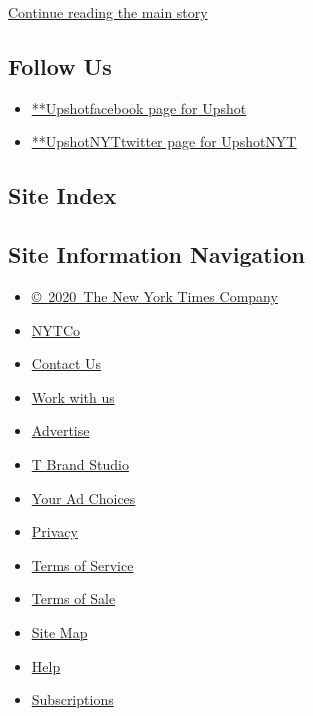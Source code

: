 \protect\hyperlink{after-mktg}{Continue reading the main story}

\hypertarget{follow-us}{%
\subsection{Follow Us}\label{follow-us}}

\begin{itemize}
\tightlist
\item
  \href{https://www.facebook.com/Upshot}{**Upshotfacebook page for
  Upshot}
\item
  \href{https://twitter.com/UpshotNYT}{**UpshotNYTtwitter page for
  UpshotNYT}
\end{itemize}

\hypertarget{site-index}{%
\subsection{Site Index}\label{site-index}}

\hypertarget{site-information-navigation}{%
\subsection{Site Information
Navigation}\label{site-information-navigation}}

\begin{itemize}
\tightlist
\item
  \href{https://help.nytimes.com/hc/en-us/articles/115014792127-Copyright-notice}{©~2020~The
  New York Times Company}
\end{itemize}

\begin{itemize}
\tightlist
\item
  \href{https://www.nytco.com/}{NYTCo}
\item
  \href{https://help.nytimes.com/hc/en-us/articles/115015385887-Contact-Us}{Contact
  Us}
\item
  \href{https://www.nytco.com/careers/}{Work with us}
\item
  \href{https://nytmediakit.com/}{Advertise}
\item
  \href{http://www.tbrandstudio.com/}{T Brand Studio}
\item
  \href{https://www.nytimes.com/privacy/cookie-policy\#how-do-i-manage-trackers}{Your
  Ad Choices}
\item
  \href{https://www.nytimes.com/privacy}{Privacy}
\item
  \href{https://help.nytimes.com/hc/en-us/articles/115014893428-Terms-of-service}{Terms
  of Service}
\item
  \href{https://help.nytimes.com/hc/en-us/articles/115014893968-Terms-of-sale}{Terms
  of Sale}
\item
  \href{https://spiderbites.nytimes.com}{Site Map}
\item
  \href{https://help.nytimes.com/hc/en-us}{Help}
\item
  \href{https://www.nytimes.com/subscription?campaignId=37WXW}{Subscriptions}
\end{itemize}
